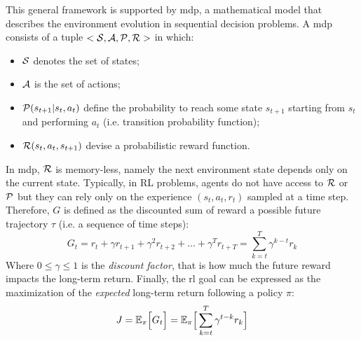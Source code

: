 This general framework is supported by \ac{mdp}, 
 a mathematical model that describes the environment evolution in sequential decision problems. 
%
A \ac{mdp} consists of a tuple $<\mathcal{S}, \mathcal{A}, \mathcal{P}, \mathcal{R}>$ in which:
\begin{itemize}
  \item $\mathcal{S}$ denotes the set of states;
  \item $\mathcal{A}$ is the set of actions;
  \item $\mathcal{P}(s_{t + 1} | s_t, a_t)$ define the probability to reach some state $s_{t + 1}$ starting from $s_t$ and performing $a_t$ (i.e. transition probability function);
  \item $\mathcal{R}(s_t, a_t, s_{t+1})$ devise a probabilistic reward function.
\end{itemize}
In \ac{mdp}, $\mathcal{R}$ is memory-less, namely the next environment state depends only on the current state. 
Typically, in RL problems, agents do not have access to $\mathcal{R}$ or $\mathcal{P}$ but they can rely only on the experience $(s_t, a_t, r_t)$ sampled at a time step. 
Therefore, $G$ is defined as the discounted sum of reward a possible future trajectory $\tau$ (i.e. a sequence of time steps):
\begin{equation}
G_{t} = r_t + \gamma r_{t + 1} + \gamma^2 r_{t + 2} + \dots + \gamma^T r_{t + T} = \sum_{k = t}^T \gamma^{k-t} r_k
\end{equation}
Where $0 \leq \gamma \leq 1$ is the \emph{discount factor}, that is how much the future reward impacts the long-term return.
Finally, the \ac{rl} goal can be expressed as the maximization of the \emph{expected} long-term return following a policy $\pi$:
\begin{equation}
J = \mathbb{E_\pi}\Big[ G_t \Big] = \mathbb{E}_\pi \Big[ \sum_{k = t}^T \gamma^{t-k} r_k \Big] 
\end{equation}

